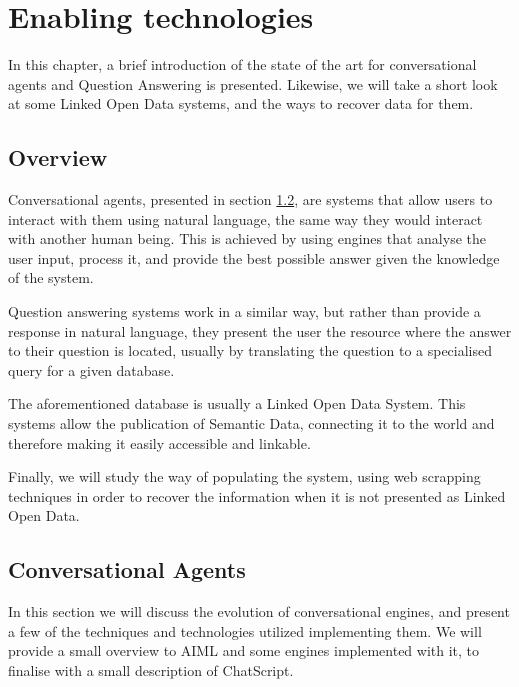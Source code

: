 \chapter{Enabling technologies}
\label{chap:state_of_the_art}

\begin{chapterintro}

In this chapter, a brief introduction of the state of the art for conversational agents and Question Answering is presented. Likewise, we will take a short look at some Linked Open Data systems, and the ways to recover data for them.

\end{chapterintro}

\cleardoublepage

\section{Overview}

Conversational agents, presented in section \ref{sec:conv_agents}, are systems that allow users to interact with them using natural language, the same way they would interact with another human being. This is achieved by using engines that analyse the user input, process it, and provide the best possible answer given the knowledge of the system.

Question answering systems work in a similar way, but rather than provide a response in natural language, they present the user the resource where the answer to their question is located, usually by translating the question to a specialised query for a given database.

The aforementioned database is usually a Linked Open Data System. This systems allow the publication of Semantic Data, connecting it to the world and therefore making it easily accessible and linkable.

Finally, we will study the way of populating the system, using web scrapping techniques in order to recover the information when it is not presented as Linked Open Data.

\section{Conversational Agents}
\label{sec:conv_agents}

In this section we will discuss the evolution of conversational engines, and present a few of the techniques and technologies utilized implementing them. We will provide a small overview to \ac{AIML} and some engines implemented with it, to finalise with a small description of ChatScript.

